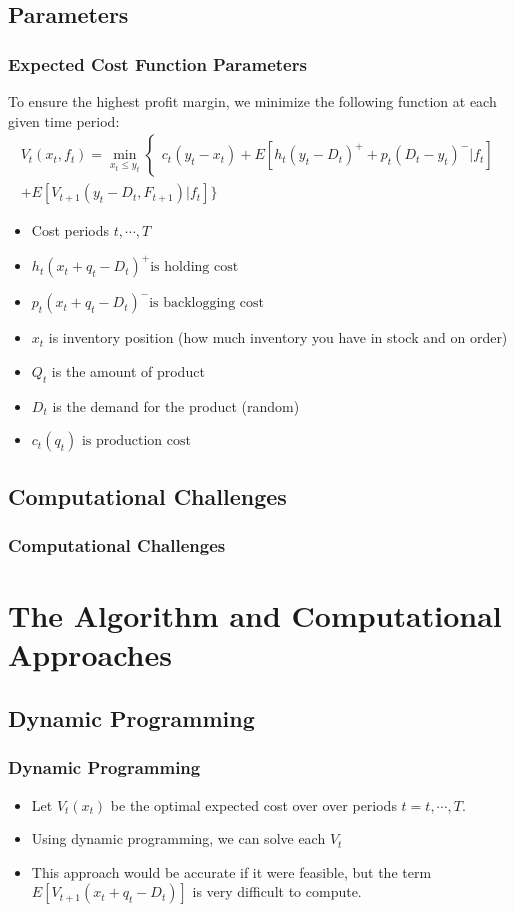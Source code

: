 \documentclass{beamer}
\begin{document}
  \subsection{Parameters}
  \begin{frame}
    \frametitle{Expected Cost Function Parameters}
    To ensure the highest profit margin, we minimize the following function at each given time period:
    \begin{eqnarray*}
    V_{t}(x_{t},f_{t}) = \min_{x_{t}\leq y_{t}}\begin{cases}c_{t}(y_{t}-x_{t})+E[h_{t}(y_{t}-D_{t})^{+}+p_{t}(D_{t}-y_{t})^{-}|f_{t}]\end{cases}\\
    + E[V_{t+1}(y_{t}-D_{t},F_{t+1})|f_{t}]\}
    \end{eqnarray*}
    \begin{itemize}
      \item Cost periods $t,\cdots,T$
      \item $h_{t}\left(x_{t}+q_{t}-D_{t}\right)^{+} \text{is holding cost}$
      \item $p_{t}\left(x_{t}+q_{t}-D_{t}\right)^{-} \text{is backlogging cost}$
      \item $x_{t}$ is inventory position (how much inventory you have in stock and on order)
      \item $Q_{t}$ is the amount of product
      \item $D_{t}$ is the demand for the product (random)
      \item $c_{t}\left(q_{t}\right) \text{ is production cost}$
    \end{itemize}
  \end{frame}
  \subsection{Computational Challenges}
  \begin{frame}
  \frametitle{Computational Challenges}

  \end{frame}

  \section{The Algorithm and Computational Approaches}
    \subsection{Dynamic Programming}
    \begin{frame}
    \frametitle{Dynamic Programming}
      \begin{itemize}
        \item Let $V_{t}\left(x_{t}\right)$ be the optimal expected cost over over periods $t=t,\cdots,T.$
        \item Using dynamic programming, we can solve each $V_{t}$
        \item This approach would be accurate if it were feasible, but the term $E\left[V_{t+1}\left(x_{t}+q_{t}-D_{t}\right)\right]$ is very difficult to compute.
      \end{itemize}
    \end{frame}
\end{document}
